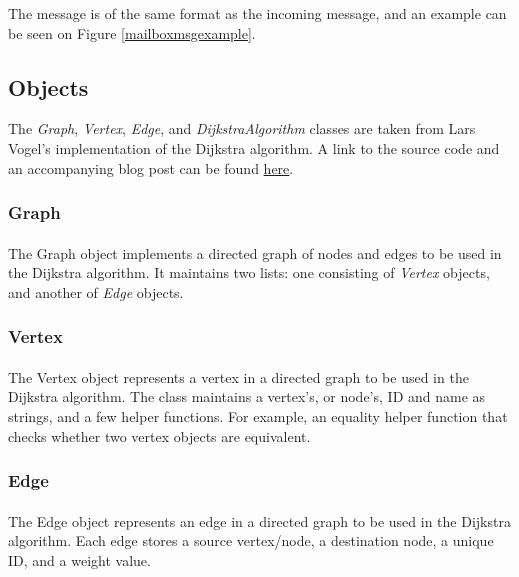 \documentclass[11pt, a4paper]{article}
\begin{document}
\hfill\break
The message is of the same format as the incoming message, and an example can be seen on Figure \ref{mailboxmsgexample}.

	
\pagebreak
	
\subsection{Objects}\label{DeliveryObjects}
The \textit{Graph}, \textit{Vertex}, \textit{Edge}, and \textit{DijkstraAlgorithm} classes are taken from Lars Vogel's implementation of the Dijkstra algorithm. A link to the source code and an accompanying blog post can be found \href{http://www.vogella.com/tutorials/JavaAlgorithmsDijkstra/article.html}{here}.
\subsubsection{Graph}
\paragraph{}
The Graph object implements a directed graph of nodes and edges to be used in the Dijkstra algorithm. It maintains two lists: one consisting of \textit{Vertex} objects, and another of \textit{Edge} objects.

\subsubsection{Vertex}
\paragraph{}
The Vertex object represents a vertex in a directed graph to be used in the Dijkstra algorithm. The class maintains a vertex's, or node's, ID and name as strings, and a few helper functions. For example, an equality helper function that checks whether two vertex objects are equivalent.

\subsubsection{Edge}
\paragraph{}
The Edge object represents an edge in a directed graph to be used in the Dijkstra algorithm. Each edge stores a source vertex/node, a destination node, a unique ID, and a weight value. 
\end{document}
